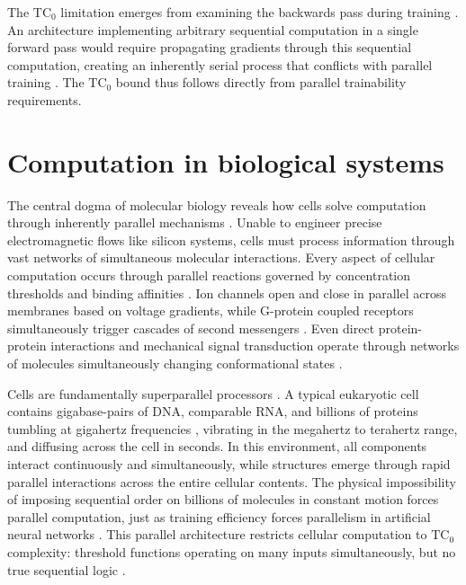 \documentclass[12pt]{article}
\begin{document}
The $\text{TC}_0$ limitation emerges from examining the backwards pass during training \cite{jung2020new}.
An architecture implementing arbitrary sequential computation in a single forward pass would require propagating gradients through this sequential computation, creating an inherently serial process that conflicts with parallel training \cite{zhu2024overcoming}.
The $\text{TC}_0$ bound thus follows directly from parallel trainability requirements.

\section{Computation in biological systems}

The central dogma of molecular biology reveals how cells solve computation through inherently parallel mechanisms \cite{wang2023parallel,cai2024efficient,fu2023scgrn}.
Unable to engineer precise electromagnetic flows like silicon systems, cells must process information through vast networks of simultaneous molecular interactions.
Every aspect of cellular computation occurs through parallel reactions governed by concentration thresholds and binding affinities \cite{alberts2022molecular}.
Ion channels open and close in parallel across membranes based on voltage gradients, while G-protein coupled receptors simultaneously trigger cascades of second messengers \cite{alberts2022molecular}.
Even direct protein-protein interactions and mechanical signal transduction operate through networks of molecules simultaneously changing conformational states \cite{alberts2022molecular,berridge2014cell}.

Cells are fundamentally superparallel processors \cite{cai2024efficient,hoel2020emergence}.
A typical eukaryotic cell contains gigabase-pairs of DNA, comparable RNA, and billions of proteins \cite{milo2013protein} tumbling at gigahertz frequencies \cite{zhang2023molecular}, vibrating in the megahertz to terahertz range, and diffusing across the cell in seconds.
In this environment, all components interact continuously and simultaneously, while structures emerge through rapid parallel interactions across the entire cellular contents.
The physical impossibility of imposing sequential order on billions of molecules in constant motion forces parallel computation, just as training efficiency forces parallelism in artificial neural networks \cite{barrett2019analyzing}.
This parallel architecture restricts cellular computation to $\text{TC}_0$ complexity: threshold functions operating on many inputs simultaneously, but no true sequential logic \cite{wang2023parallel}.
\end{document}
